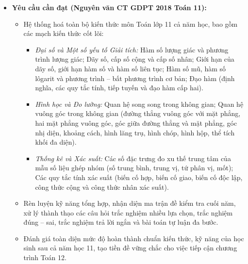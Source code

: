 \documentclass[12pt, a4paper]{article}
\begin{document}
\begin{itemize}[leftmargin=1.2cm]
    \item \textbf{Yêu cầu cần đạt (Nguyên văn CT GDPT 2018 Toán 11):}
    \begin{itemize}[leftmargin=0.6cm]
        \item Hệ thống hoá toàn bộ kiến thức môn Toán lớp 11 cả năm học, bao gồm các mạch kiến thức cốt lõi:
        \begin{itemize}
            \item \textit{Đại số và Một số yếu tố Giải tích:} Hàm số lượng giác và phương trình lượng giác; Dãy số, cấp số cộng và cấp số nhân; Giới hạn của dãy số, giới hạn hàm số và hàm số liên tục; Hàm số mũ, hàm số lôgarit và phương trình -- bất phương trình cơ bản; Đạo hàm (định nghĩa, các quy tắc tính, tiếp tuyến và đạo hàm cấp hai).
            \item \textit{Hình học và Đo lường:} Quan hệ song song trong không gian; Quan hệ vuông góc trong không gian (đường thẳng vuông góc với mặt phẳng, hai mặt phẳng vuông góc, góc giữa đường thẳng và mặt phẳng, góc nhị diện, khoảng cách, hình lăng trụ, hình chóp, hình hộp, thể tích khối đa diện).
            \item \textit{Thống kê và Xác suất:} Các số đặc trưng đo xu thế trung tâm của mẫu số liệu ghép nhóm (số trung bình, trung vị, tứ phân vị, mốt); Các quy tắc tính xác suất (biến cố hợp, biến cố giao, biến cố độc lập, công thức cộng và công thức nhân xác suất).
        \end{itemize}
        \item Rèn luyện kỹ năng tổng hợp, nhận diện ma trận đề kiểm tra cuối năm, xử lý thành thạo các câu hỏi trắc nghiệm nhiều lựa chọn, trắc nghiệm đúng -- sai, trắc nghiệm trả lời ngắn và bài toán tự luận đa bước.
        \item Đánh giá toàn diện mức độ hoàn thành chuẩn kiến thức, kỹ năng của học sinh sau cả năm học 11, tạo tiền đề vững chắc cho việc tiếp cận chương trình Toán 12.
    \end{itemize}


\end{itemize}
\end{document}
